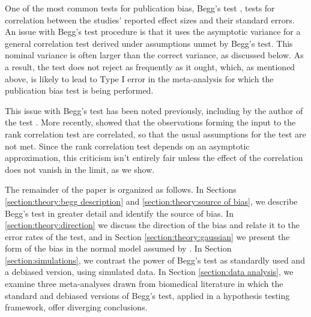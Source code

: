 \documentclass[12pt]{article}
\begin{document}
  One of the most common tests for publication bias, Begg's test
  \citep{begg1994a}, tests for correlation between the studies' reported
  effect sizes and their standard errors.  An issue with Begg's test
  procedure is that it uses the asymptotic variance for a general
  correlation test derived under assumptions unmet by Begg's
  test. This nominal variance is often larger than the correct
  variance, as discussed below. As a result, the test does not reject
  as frequently as it ought, which, as mentioned above, is likely to
  lead to Type I error in the meta-analysis for which the publication
  bias test is being performed.

    

    
    
    

  This issue with Begg's test has been noted previously, including by
  the author of the test \citep{begg1994a,begg1994b}. More recently,
  \citet{gjerdevik2014} showed that the observations forming the input
  to the rank correlation test are correlated, so that the usual
  assumptions for the test are not met. Since the
  rank correlation test depends on an asymptotic approximation, this
  criticism isn't entirely fair unless the effect of the correlation
  does not vanish in the limit, as we show.

  The remainder of the paper is organized as follows. In Sections
  \ref{section:theory:begg description} and \ref{section:theory:source
    of bias}, we describe Begg's test in greater detail and identify
  the source of bias. In \ref{section:theory:direction} we discuss the
  direction of the bias and relate it to the error rates of the test,
  and in Section \ref{section:theory:gaussian} we present the form of
  the bias in the normal model assumed by \citet{begg1994a}. In
  Section \ref{section:simulations}, we contrast the power of Begg's
  test as standardly used and a debiased version, using simulated
  data. In Section \ref{section:data analysis}, we examine three
  meta-analyses drawn from biomedical literature in which the standard
  and debiased versions of Begg's test, applied in a hypothesis
  testing framework, offer diverging conclusions.
  
\end{document}
